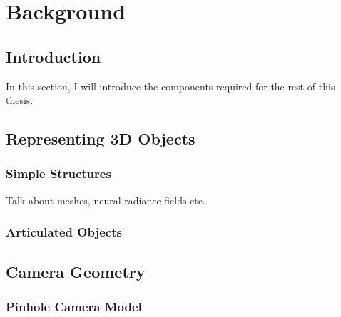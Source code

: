 
\chapter{Background}

\ifpdf
    \graphicspath{{Chapter2/Figs/Raster/}{Chapter2/Figs/PDF/}{Chapter2/Figs/}}
\else
    \graphicspath{{Chapter2/Figs/Vector/}{Chapter2/Figs/}}
\fi



\section{Introduction}

In this section, I will introduce the components required for the rest of this thesis.

\section{Representing 3D Objects}

\subsection{Simple Structures}
Talk about meshes, neural radiance fields etc.

\subsection{Articulated Objects}

\section{Camera Geometry}

\subsection{Pinhole Camera Model}

